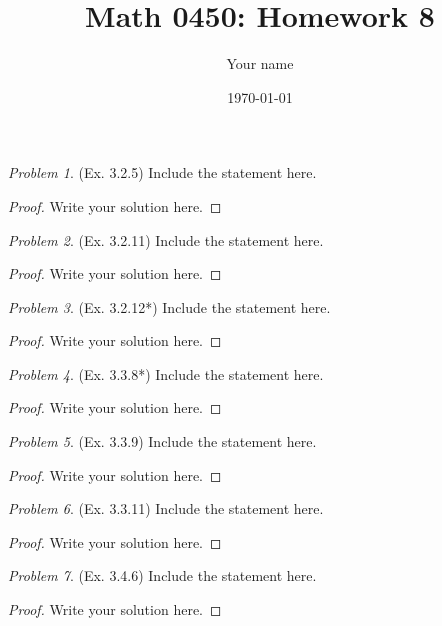 \documentclass[11pt,twoside, reqno]{amsart}
\theoremstyle{remark}
\newtheorem{Prob}{Problem}
\begin{document}
\title{Math 0450: Homework 8}
\date{\today}
\author{Your name}

\maketitle

\begin{Prob}(Ex. 3.2.5) Include the statement here.


\end{Prob}

\begin{proof}
Write your solution here.

\end{proof}

\begin{Prob}(Ex. 3.2.11)  Include the statement here.


\end{Prob}

\begin{proof}
Write your solution here.

\end{proof}

\begin{Prob}(Ex. 3.2.12*)  Include the statement here.
\end{Prob}

\begin{proof}
Write your solution here.

\end{proof}


\begin{Prob}(Ex. 3.3.8*)  Include the statement here.
\end{Prob}

\begin{proof}
Write your solution here.

\end{proof}


\begin{Prob}(Ex. 3.3.9)  Include the statement here.
\end{Prob}

\begin{proof}
Write your solution here.

\end{proof}

\begin{Prob}(Ex. 3.3.11)  Include the statement here.
\end{Prob}

\begin{proof}
Write your solution here.

\end{proof}

\begin{Prob}(Ex. 3.4.6)  Include the statement here.
\end{Prob}

\begin{proof}
Write your solution here.

\end{proof}
\end{document}
